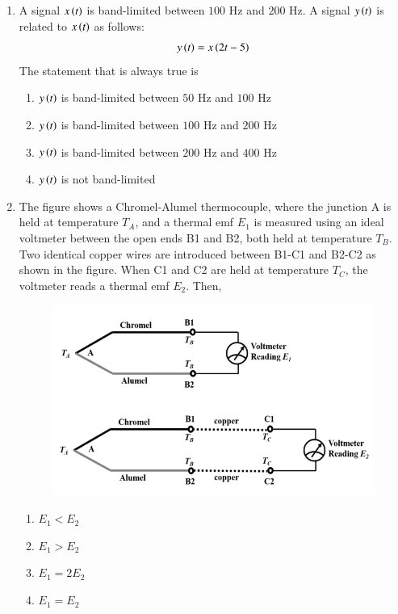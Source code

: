\documentclass[journal,12pt,onecolumn]{IEEEtran}
\theoremstyle{remark}
\begin{document}
\begin{enumerate}
\item A signal $x\left(t\right)$ is band-limited between $100$ Hz and $200$ Hz. A signal $y\left(t\right)$ is related to $x\left(t\right)$ as follows:
\begin{align*}
y\left(t\right) = x\left(2t - 5\right) 
\end{align*}
The statement that is always true is \underline{\hspace{2cm}}

\hfill{}
\begin{enumerate}
\item $y\left(t\right)$ is band-limited between $50$ Hz and $100$ Hz
\item $y\left(t\right)$ is band-limited between $100$ Hz and $200$ Hz
\item $y\left(t\right)$ is band-limited between $200$ Hz and $400$ Hz
\item $y\left(t\right)$ is not band-limited
\end{enumerate}

\item The figure shows a Chromel-Alumel thermocouple, where the junction A is held at temperature $T_A$, and a thermal emf $E_1$ is measured using an ideal voltmeter between the open ends B1 and B2, both held at temperature $T_B$. Two identical copper wires are introduced between B1-C1 and B2-C2 as shown in the figure. When C1 and C2 are held at temperature $T_C$, the voltmeter reads a thermal emf $E_2$. Then, \underline{\hspace{2cm}}

\hfill{}
\begin{figure}[H]
\includegraphics[width = 0.75\columnwidth]{q19}
\caption*{}
\label{fig:q19}
\end{figure}
\begin{enumerate}
\item $E_1 < E_2$
\item $E_1 > E_2$
\item $E_1 = 2E_2$
\item $E_1 = E_2$
\end{enumerate}


\end{enumerate}
\end{document}
